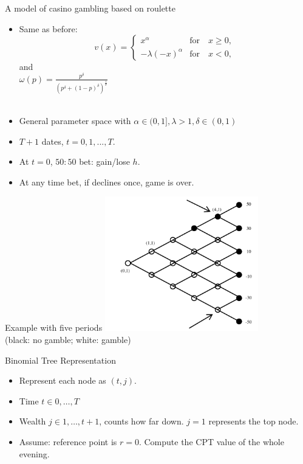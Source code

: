 \documentclass[11pt, aspectratio=169]{beamer}
\begin{document}
\begin{frame}{A model of casino gambling based on roulette}
    \begin{itemize}
    \item Same as before:\medskip
        \[
        v(x) = \begin{cases}
            x^\alpha  &  \text{for} \quad x \geq 0,\\
            -\lambda (-x)^\alpha & \text{for} \quad x<0,
            \end{cases}
        \]\medskip
        and \\
        {\centering $ \omega(p)=\frac{p^\delta }{(p^\delta + (1-p)^\delta)^{\frac{1}{\delta}}} $\\

        }
        \hspace*{\fill} \\
    \item General parameter space  with $\alpha \in (0,1], \lambda>1,  \delta \in (0,1) $\medskip
    \item $T+1$ dates, $t=0,1,...,T.$\\ \medskip
    \item At $t=0$, $50:50$ bet: gain/lose $h$.\medskip
    \item At any time bet, if declines once, game is over.\medskip
    \end{itemize}
\end{frame}

\begin{frame}{Example with five periods}
\centering
        \includegraphics[width = 0.5\textwidth]{fig2.png}\\
    (black: no gamble; white: gamble)
    \end{frame}

\begin{frame}{Binomial Tree Representation}
    \begin{itemize}
        \item Represent each node as $(t, j)$.\bigskip
        \item Time $t \in {0,\ldots ,T}$ \bigskip
        \item Wealth $ j \in {1,\ldots, t+1}$, counts how far down. $j=1$ represents the top node.\bigskip
        \item Assume: reference point is $r=0$. Compute the CPT value of the whole evening.\bigskip
    \end{itemize}
\end{frame}
\end{document}
